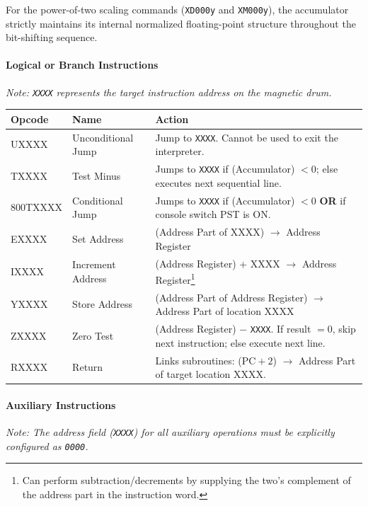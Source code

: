 For the power-of-two scaling commands (\texttt{XD000y} and \texttt{XM000y}), the accumulator strictly maintains its internal normalized floating-point structure throughout the bit-shifting sequence.

\paragraph{Logical or Branch Instructions}
\textit{Note: \texttt{XXXX} represents the target instruction address on the magnetic drum.}

\begin{table}[h]
\centering
\small
\ttfamily
\begin{tabularx}{\textwidth}{llX}
\toprule
\textbf{Opcode} & \textbf{Name} & \textbf{Action} \\ 
\midrule
UXXXX & Unconditional Jump & Jump to \texttt{XXXX}. Cannot be used to exit the interpreter. \\
TXXXX & Test Minus & Jumps to \texttt{XXXX} if (Accumulator) $< 0$; else executes next sequential line. \\
800TXXXX & Conditional Jump & Jumps to \texttt{XXXX} if (Accumulator) $< 0$ \textbf{OR} if console switch \textsf{PST} is \textsf{ON}. \\
EXXXX & Set Address & (Address Part of XXXX) $\rightarrow$ Address Register \\
IXXXX & Increment Address & (Address Register) + XXXX $\rightarrow$ Address Register\footnote{Can perform subtraction/decrements by supplying the two's complement of the address part in the instruction word.} \\
YXXXX & Store Address & (Address Part of Address Register) $\rightarrow$ Address Part of location XXXX \\
ZXXXX & Zero Test & (Address Register) $-$ \texttt{XXXX}. If result $= 0$, skip next instruction; else execute next line. \\
RXXXX & Return & Links subroutines: ($\text{PC} + 2$) $\rightarrow$ Address Part of target location XXXX. \\
\bottomrule
\end{tabularx}
\end{table}

\paragraph{Auxiliary Instructions}
\textit{Note: The address field (\texttt{XXXX}) for all auxiliary operations must be explicitly configured as \texttt{0000}.}

